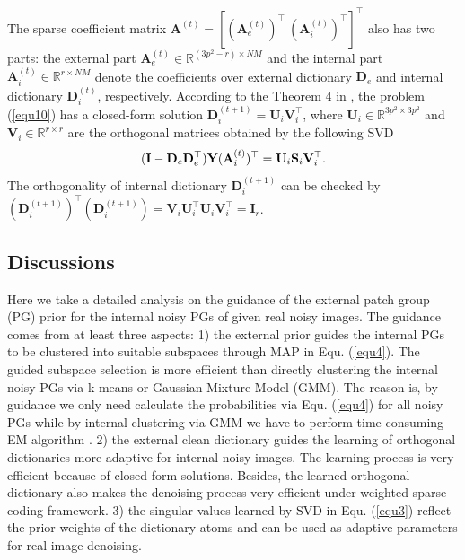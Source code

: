 \documentclass[10pt,twocolumn,letterpaper]{article}
\begin{document}
The sparse coefficient matrix $\mathbf{A}^{(t)}=[(\mathbf{A}_{e}^{(t)})^{\top}\ (\mathbf{A}_{i}^{(t)})^{\top}]^{\top}$ also has two parts: the external part $\mathbf{A}_{e}^{(t)}\in\mathbb{R}^{(3p^2-r)\times NM}$ and the internal part $\mathbf{A}_{i}^{(t)}\in\mathbb{R}^{r\times NM}$ denote the coefficients over external dictionary $\mathbf{D}_{e}$ and internal dictionary $\mathbf{D}_{i}^{(t)}$, respectively. According to the Theorem 4 in \cite{spca}, the problem (\ref{equ10}) 
has a closed-form solution $\mathbf{D}_{i}^{(t+1)}=\mathbf{U}_{i}\mathbf{V}_{i}^{\top}$, where $\mathbf{U}_{i}\in\mathbb{R}^{3p^2\times 3p^2}$ and $\mathbf{V}_{i}\in\mathbb{R}^{r\times r}$ are the orthogonal matrices obtained by the following SVD
\vspace{-1mm}
\begin{equation}\label{equ11}\vspace{-2mm}
(\mathbf{I}-\mathbf{D}_{e}\mathbf{D}_{e}^{\top})\mathbf{Y}(\mathbf{A}_{i}^{(t)})^{\top}
=
\mathbf{U}_{i}\mathbf{S}_{i}\mathbf{V}_{i}^{\top}.
\end{equation}
The orthogonality of internal dictionary $\mathbf{D}_{i}^{(t+1)}$ can be checked by 
$(\mathbf{D}_{i}^{(t+1)})^{\top}(\mathbf{D}_{i}^{(t+1)})=\mathbf{V}_{i}\mathbf{U}_{i}^{\top}\mathbf{U}_{i}\mathbf{V}_{i}^{\top}=\mathbf{I}_{r}$.

\subsection{Discussions}

Here we take a detailed analysis on the guidance of the external patch group (PG) prior for the internal noisy PGs of given real noisy images. The guidance comes from at least three aspects: 1) the external prior guides the internal PGs to be clustered into suitable subspaces through MAP in Equ. (\ref{equ4}). The guided subspace selection is more efficient than directly clustering the internal noisy PGs via k-means or Gaussian Mixture Model (GMM). The reason is, by guidance we only need calculate the probabilities via Equ. (\ref{equ4}) for all noisy PGs while by internal clustering via GMM we have to perform time-consuming EM algorithm \cite{em}. 2) the external clean dictionary guides the learning of orthogonal dictionaries more adaptive for internal noisy images. The learning process is very efficient because of closed-form solutions. Besides, the learned orthogonal dictionary also makes the denoising process very efficient under weighted sparse coding framework. 3) the singular values learned by SVD in Equ. (\ref{equ3}) reflect the prior weights of the dictionary atoms and can be used as adaptive parameters for real image denoising.
\end{document}
